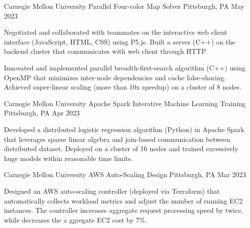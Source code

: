 

\begin{cventries}

  \cventry
    {Carnegie Mellon University} %
    {Parallel Four-color Map Solver} %
    {Pittsburgh, PA} %
    {May 2023} %
    {
      \begin{cvitems} %
        \item {Negotiated and collaborated with teammates on the interactive web client interface (JavaScript, HTML, CSS) 
        using P5.js. Built a server (C++) on the backend cluster that communicates with web client through HTTP.}
        \item {Innovated and implemented parallel breadth-first-search algorithm (C++) using OpenMP that minimizes 
        inter-node dependencies and cache false-sharing. Achieved super-linear scaling (more than 10x speedup) on 
        a cluster of 8 nodes.}
      \end{cvitems}
    }

  \cventry
    {Carnegie Mellon University} %
    {Apache Spark Interative Machine Learning Training} %
    {Pittsburgh, PA} %
    {Apr 2023} %
    {
      \begin{cvitems} %
        \item {Developed a distributed logistic regression algorithm (Python) in Apache Spark that leverages 
        sparse linear algebra and join-based communication between distributed dataset. Deployed on a cluster 
        of 16 nodes and trained excessively huge models within reasonable time limits.}
      \end{cvitems}
    }

  \cventry
    {Carnegie Mellon University} %
    {AWS Auto-Scaling Design} %
    {Pittsburgh, PA} %
    {Mar 2023} %
    {
      \begin{cvitems} %
        \item {Designed an AWS auto-scaling controller (deployed via Terraform) that automatically 
        collects workload metrics and adjust the number of running EC2 instances. The controller 
        increases aggregate request processing speed by twice, while decreases the a ggregate EC2 
        cost by 7\%.}
      \end{cvitems}
    }


\end{cventries}
